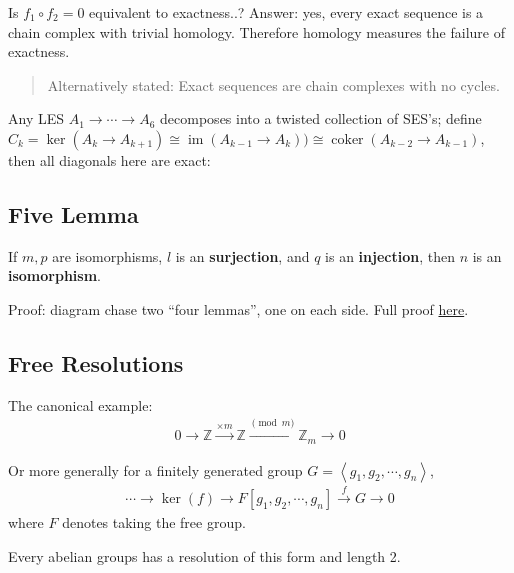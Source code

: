 \begin{remark}

Is \(f_1\circ f_2 = 0\) equivalent to exactness..? Answer: yes, every
exact sequence is a chain complex with trivial homology. Therefore
homology measures the failure of exactness.

\begin{quote}
Alternatively stated: Exact sequences are chain complexes with no
cycles.
\end{quote}

\end{remark}

\begin{remark}

Any LES \(A_1 \to\cdots \to A_6\) decomposes into a twisted collection
of SES's; define
\(C_k = \ker (A_k \to A_{k+1}) \cong \operatorname{im}(A_{k-1} \to A_k)) \cong \operatorname{coker}(A_{k-2} \to A_{k-1})\),
then all diagonals here are exact:

\end{remark}

\hypertarget{five-lemma}{%
\subsection{Five Lemma}\label{five-lemma}}

\begin{theorem}[?]

If \(m, p\) are isomorphisms, \(l\) is an \textbf{surjection}, and \(q\)
is an \textbf{injection}, then \(n\) is an \textbf{isomorphism}.

Proof: diagram chase two ``four lemmas'', one on each side. Full proof
\href{https://en.wikipedia.org/wiki/Five_lemma}{here}.

\end{theorem}

\hypertarget{free-resolutions}{%
\subsection{Free Resolutions}\label{free-resolutions}}

\begin{example}[?]

The canonical example:
\begin{align*}
0 \to {\mathbb{Z}}\xrightarrow{\times m} {\mathbb{Z}}\xrightarrow{\pmod m} {\mathbb{Z}}_m \to 0
\end{align*}

Or more generally for a finitely generated group
\(G = \left\langle{g_1, g_2, \cdots, g_n}\right\rangle\),
\begin{align*}
\cdots \to \ker(f) \to F[g_1, g_2, \cdots, g_n] \xrightarrow{f} G \to 0
\end{align*}
where \(F\) denotes taking the free group.

Every abelian groups has a resolution of this form and length 2.

\end{example}

